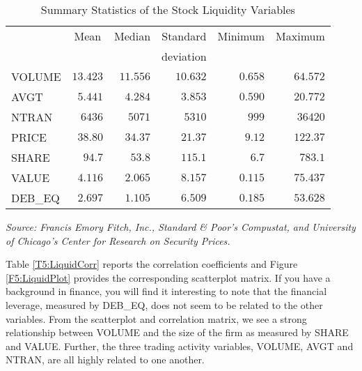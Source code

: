 \begin{table}[h]

\caption{\label{T5:LiquidSumStats} Summary Statistics of the Stock
Liquidity Variables}

\begin{tabular}{cccccc}
\hline
& Mean & Median & Standard & Minimum & Maximum \\
&  &  & deviation &  &  \\ \hline
\multicolumn{1}{l}{VOLUME} & \multicolumn{1}{r}{$13.423$} &
\multicolumn{1}{r}{$11.556$} & \multicolumn{1}{r}{$10.632$} &
\multicolumn{1}{r}{$0.658$} & \multicolumn{1}{r}{$64.572$} \\
\multicolumn{1}{l}{AVGT} & \multicolumn{1}{r}{$5.441$} & \multicolumn{1}{r}{$%
4.284$} & \multicolumn{1}{r}{$3.853$} & \multicolumn{1}{r}{$0.590$} &
\multicolumn{1}{r}{$20.772$} \\
\multicolumn{1}{l}{NTRAN} & \multicolumn{1}{r}{$6436$} & \multicolumn{1}{r}{$%
5071$} & \multicolumn{1}{r}{$5310$} & \multicolumn{1}{r}{$999$} &
\multicolumn{1}{r}{$36420$} \\
\multicolumn{1}{l}{PRICE} & \multicolumn{1}{r}{$38.80$} & \multicolumn{1}{r}{%
$34.37$} & \multicolumn{1}{r}{$21.37$} & \multicolumn{1}{r}{$9.12$} &
\multicolumn{1}{r}{$122.37$} \\
\multicolumn{1}{l}{SHARE} & \multicolumn{1}{r}{$94.7$} & \multicolumn{1}{r}{$%
53.8$} & \multicolumn{1}{r}{$115.1$} & \multicolumn{1}{r}{$6.7$} &
\multicolumn{1}{r}{$783.1$} \\
\multicolumn{1}{l}{VALUE} & \multicolumn{1}{r}{$4.116$} & \multicolumn{1}{r}{%
$2.065$} & \multicolumn{1}{r}{$8.157$} & \multicolumn{1}{r}{$0.115$} &
\multicolumn{1}{r}{$75.437$} \\
\multicolumn{1}{l}{DEB\_EQ} & \multicolumn{1}{r}{$2.697$} &
\multicolumn{1}{r}{$1.105$} & \multicolumn{1}{r}{$6.509$} &
\multicolumn{1}{r}{$0.185$} & \multicolumn{1}{r}{$53.628$} \\ \hline
\end{tabular}

\textit{Source: Francis Emory Fitch, Inc., Standard \& Poor's
Compustat, and University of Chicago's Center for Research on
Security Prices.}

\end{table}

Table \ref{T5:LiquidCorr} reports the correlation coefficients and
Figure \ref{F5:LiquidPlot} provides the corresponding scatterplot
matrix. If you have a background in finance, you will find it
interesting to note that the financial leverage, measured by
DEB\_EQ, does not seem to be related to the other variables. From
the scatterplot and correlation matrix, we see a strong relationship
between VOLUME and the size of the firm as measured by SHARE and
VALUE. Further, the three trading activity variables, VOLUME, AVGT
and NTRAN, are all highly related to one another.

